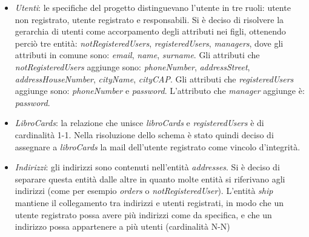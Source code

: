 \documentclass[a4paper,11pt]{report}
\begin{document}
\begin{itemize}
    \item \textit{Utenti}: le specifiche del progetto distinguevano l'utente in tre ruoli: utente non registrato, utente registrato e responsabili. Si è deciso di risolvere la gerarchia di utenti come accorpamento degli attributi nei figli, ottenendo perciò tre entità: \textit{notRegisteredUsers}, \textit{registeredUsers}, \textit{managers}, dove gli attributi in comune sono: \textit{email}, \textit{name}, \textit{surname}.
    \newline
    Gli attributi che \textit{notRegisteredUsers} aggiunge sono: \textit{phoneNumber}, \textit{addressStreet}, \textit{addressHouseNumber}, \textit{cityName}, \textit{cityCAP}.
    \newline
    Gli attributi che \textit{registeredUsers} aggiunge sono: \textit{phoneNumber} e \textit{password}.
    \newline
    L'attributo che \textit{manager} aggiunge è: \textit{password}.
    \item \textit{LibroCards}: la relazione che unisce \textit{libroCards} e \textit{registeredUsers} è di cardinalità 1-1. Nella risoluzione dello schema è stato quindi deciso di assegnare a \textit{libroCards} la mail dell'utente registrato come vincolo d'integrità.
    
    \item \textit{Indirizzi}: gli indirizzi sono contenuti nell'entità \textit{addresses}. Si è deciso di separare questa entità dalle altre in quanto molte entità si riferivano agli indirizzi (come per esempio \textit{orders} o \textit{notRegisteredUser}). 
    \newline
    L'entità \textit{ship} mantiene il collegamento tra indirizzi e utenti registrati, in modo che un utente registrato possa avere più indirizzi come da specifica, e che un indirizzo possa appartenere a più utenti (cardinalità N-N) 
\end{itemize}
\end{document}
